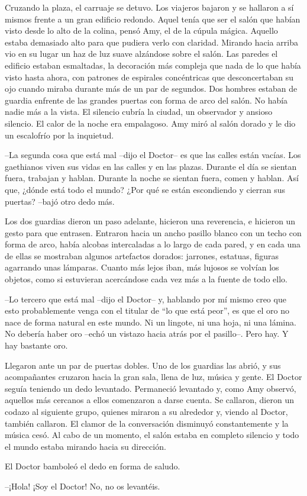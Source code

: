 {Cruzando la plaza, el carruaje se detuvo. Los viajeros bajaron y se
	hallaron a sí mismos frente a un gran edificio redondo. Aquel tenía que
	ser el salón que habían visto desde lo alto de la colina, pensó Amy, el
	de la cúpula mágica. Aquello estaba demasiado alto para que pudiera
	verlo con claridad. Mirando hacia arriba vio en su lugar un haz de luz
	suave alzándose sobre el salón. Las paredes el edificio estaban
	esmaltadas, la decoración más compleja que nada de lo que había visto
	hasta ahora, con patrones de espirales concéntricas que desconcertaban
	su ojo cuando miraba durante más de un par de segundos. Dos hombres
	estaban de guardia enfrente de las grandes puertas con forma de arco del
	salón. No había nadie más a la vista. El silencio cubría la ciudad, un
	observador y ansioso silencio. El calor de la noche era empalagoso. Amy
miró al salón dorado y le dio un escalofrío por la inquietud.}

{--La segunda cosa que está mal --dijo el Doctor-- es que las calles
	están vacías. Los gaethianos viven sus vidas en las calles y en las
	plazas. Durante el día se sientan fuera, trabajan y hablan. Durante la
	noche se sientan fuera, comen y hablan. Así que, ¿dónde está todo el
	mundo? ¿Por qué se están escondiendo y cierran sus puertas? --bajó otro
dedo más.}

{Los dos guardias dieron un paso adelante, hicieron una reverencia, e
	hicieron un gesto para que entrasen. Entraron hacia un ancho pasillo
	blanco con un techo con forma de arco, había alcobas intercaladas a lo
	largo de cada pared, y en cada una de ellas se mostraban algunos
	artefactos dorados: jarrones, estatuas, figuras agarrando unas lámparas.
	Cuanto más lejos iban, más lujosos se volvían los objetos, como si
estuvieran acercándose cada vez más a la fuente de todo ello.}

{--Lo tercero que está mal --dijo el Doctor-- y, hablando por mí mismo
	creo que esto probablemente venga con el titular de ``lo que está
	peor'', es que el oro no nace de forma natural en este mundo. Ni un
	lingote, ni una hoja, ni una lámina. No debería haber oro --echó un
vistazo hacia atrás por el pasillo--. Pero hay. Y hay bastante oro.}

{Llegaron ante un par de puertas dobles. Uno de los guardias las abrió,
	y sus acompañantes cruzaron hacia la gran sala, llena de luz, música y
	gente. El Doctor seguía teniendo un dedo levantado. Permaneció levantado
	y, como Amy observó, aquellos más cercanos a ellos comenzaron a darse
	cuenta. Se callaron, dieron un codazo al siguiente grupo, quienes
	miraron a su alrededor y, viendo al Doctor, también callaron. El clamor
	de la conversación disminuyó constantemente y la música cesó. Al cabo de
	un momento, el salón estaba en completo silencio y todo el mundo estaba
mirando hacia su dirección.}

{El Doctor bamboleó el dedo en forma de saludo.}

{--¡Hola! ¡Soy el Doctor! No, no os levantéis.}

{}

